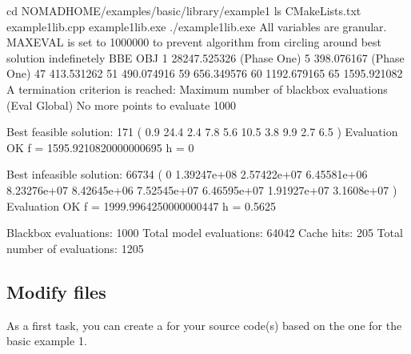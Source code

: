 \documentclass[letterpaper,10pt,english]{sphinxmanual}
\begin{document}
\begin{sphinxVerbatim}[commandchars=\\\{\}]
\PYGZgt{} cd \PYGZdl{}NOMAD\PYGZus{}HOME/examples/basic/library/example1
\PYGZgt{} ls
CMakeLists.txt                example1\PYGZus{}lib.cpp        example1\PYGZus{}lib.exe
\PYGZgt{} ./example1\PYGZus{}lib.exe
All variables are granular. MAX\PYGZus{}EVAL is set to 1000000 to prevent algorithm from circling around best solution indefinetely
BBE OBJ
1 \PYGZhy{}28247.525326  (Phase One)
5   \PYGZhy{}398.076167  (Phase One)
47   \PYGZhy{}413.531262
51   \PYGZhy{}490.074916
59   \PYGZhy{}656.349576
60  \PYGZhy{}1192.679165
65  \PYGZhy{}1595.921082
A termination criterion is reached: Maximum number of blackbox evaluations (Eval Global) No more points to evaluate 1000

Best feasible solution:     \PYGZsh{}171 ( 0.9 24.4 2.4 7.8 5.6 10.5 3.8 9.9 2.7 6.5 )        Evaluation OK    f = \PYGZhy{}1595.9210820000000695      h =   0

Best infeasible solution:   \PYGZsh{}66734 ( 0 \PYGZhy{}1.39247e+08 2.57422e+07 \PYGZhy{}6.45581e+06 \PYGZhy{}8.23276e+07 \PYGZhy{}8.42645e+06 7.52545e+07 6.46595e+07 1.91927e+07 3.1608e+07 )       Evaluation OK    f = \PYGZhy{}1999.9964250000000447      h =   0.5625

Blackbox evaluations:        1000
Total model evaluations:     64042
Cache hits:                  205
Total number of evaluations: 1205
\end{sphinxVerbatim}


\subsection{Modify  files}
\label{\detokenize{LibraryMode:modify-cmake-files}}
\sphinxAtStartPar
As a first task, you can create a  for your source code(s) based on the one for the basic example 1.
\end{document}
